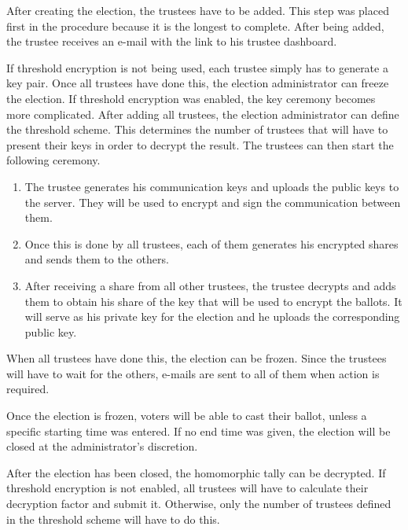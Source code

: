 \par After creating the election, the trustees have to be added. This step was placed first in the procedure because it is the longest to complete. After being added, the trustee receives an e-mail with the link to his trustee dashboard.

\par If threshold encryption is not being used, each trustee simply has to generate a key pair. Once all trustees have done this, the election administrator can freeze the election. If threshold encryption was enabled, the key ceremony becomes more complicated. After adding all trustees, the election administrator can define the threshold scheme. This determines the number of trustees that will have to present their keys in order to decrypt the result. The trustees can then start the following ceremony.

\begin{enumerate}
  \item The trustee generates his communication keys and uploads the public keys to the server. They will be used to encrypt and sign the communication between them.
  \item Once this is done by all trustees, each of them generates his encrypted shares and sends them to the others.
  \item After receiving a share from all other trustees, the trustee decrypts and adds them to obtain his share of the key that will be used to encrypt the ballots. It will serve as his private key for the election and he uploads the corresponding public key.
\end{enumerate}

\par When all trustees have done this, the election can be frozen. Since the trustees will have to wait for the others, e-mails are sent to all of them when action is required.

\par Once the election is frozen, voters will be able to cast their ballot, unless a specific starting time was entered. If no end time was given, the election will be closed at the administrator's discretion.

\par After the election has been closed, the homomorphic tally can be decrypted. If threshold encryption is not enabled, all trustees will have to calculate their decryption factor and submit it. Otherwise, only the number of trustees defined in the threshold scheme will have to do this.
